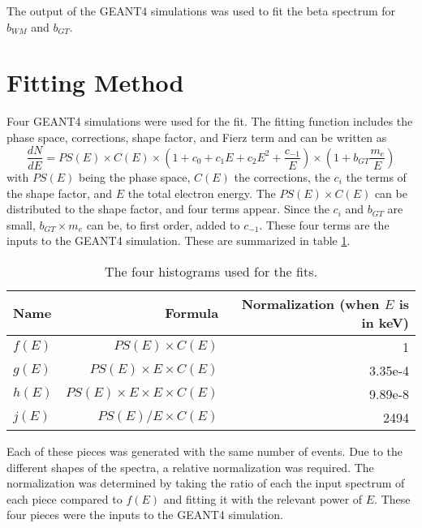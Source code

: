 \documentclass[../MaxHughesThesis.tex]{subfiles}
\begin{document}
The output of the GEANT4 simulations was used to fit the beta spectrum for $b_{WM}$ and $b_{GT}$.

\section{Fitting Method}
Four GEANT4 simulations were used for the fit.
The fitting function includes the phase space, corrections, shape factor, and Fierz term and can be written as
\begin{equation}
	\frac{dN}{dE}= PS(E) \times C(E) \times (1 + c_{0} + c_{1} E + c_{2} E^{2} + \frac{c_{-1}}{E}) \times (1 + b_{GT}\frac{m_{e}}{E})
	\label{eq:betaspecwshape}
\end{equation}
with $PS(E)$ being the phase space, $C(E)$ the corrections, the $c_{i}$ the terms of the shape factor, and $E$ the total electron energy. 
The $PS(E)\times C(E)$ can be distributed to the shape factor, and four terms appear.
Since the $c_{i}$ and $b_{GT}$ are small, $b_{GT} \times m_{e}$ can be, to first order, added to $c_{-1}$. 
These four terms are the inputs to the GEANT4 simulation.
These are summarized in table \ref{tab:4histfit}.

\begin{table}[!hbt]
	\centering
	\caption{The four histograms used for the fits.}
		\begin{tabular}{lrr} \hline \hline 
		Name & Formula & Normalization (when $E$ is in keV) \\ \hline
		$f(E)$ & $PS(E) \times C(E)$ & 1 \\
		$g(E)$ & $PS(E) \times E \times C(E)$ & 3.35e-4 \\
		$h(E)$ &  $PS(E)  \times E \times E \times C(E)$ & 9.89e-8 \\
		$j(E)$ &  $PS(E)/E \times C(E)$ & 2494 \\ \hline \hline
		\end{tabular}
		\label{tab:4histfit}
\end{table}

Each of these pieces was generated with the same number of events.
Due to the different shapes of the spectra, a relative normalization was required.
The normalization was determined by taking the ratio of each the input spectrum of each piece compared to $f(E)$ and fitting it with the relevant power of $E$. 
These four pieces were the inputs to the GEANT4 simulation.
\end{document}
